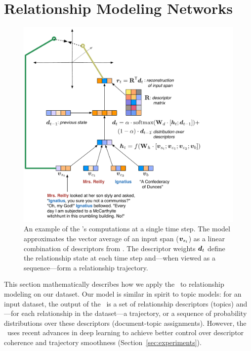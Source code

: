 \section{Relationship Modeling Networks}
\label{sec:model}

\begin{figure}[t!]
\includegraphics[width=1.15\linewidth]{2016_naacl_relationships/figures/rmn.pdf}
\caption{An example of the \rmn's computations at a single time step. The model
  approximates the vector average of an input span ($\boldsymbol{v}_{s_t}$) as a
  linear combination of descriptors from . The descriptor weights
  $\boldsymbol{d}_t$ define the relationship state at each time step and---when viewed
  as a sequence---form a relationship trajectory.}
\label{fig:rmn}
\end{figure}

This section mathematically describes how we apply the \rmn\ to relationship
modeling on our dataset. Our model is similar in spirit to topic models: for an
input dataset, the output of the \rmn\ is a set of relationship descriptors
(topics) and---for each relationship in the dataset---a trajectory, or a
sequence of probability distributions over these descriptors (document-topic
assignments). However, the \rmn\ uses recent advances in deep learning to
achieve better control over descriptor coherence and trajectory smoothness
(Section~\ref{sec:experiments}).

